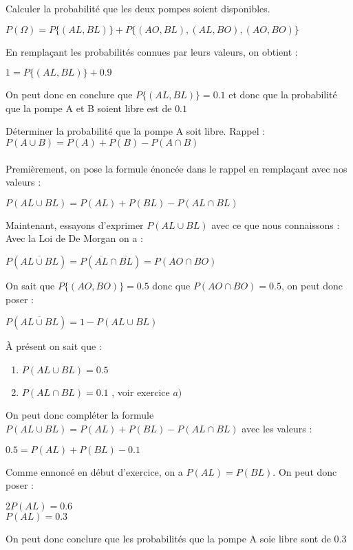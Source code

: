 \begin{exo}
\begin{subexo}{Calculer la probabilité que les deux pompes soient disponibles.}
			\begin{center}$P(\Omega) = P\{(AL,BL)\} + P\{(AO,BL),(AL,BO),(AO,BO)\}$\end{center}
			En remplaçant les probabilités connues par leurs valeurs, on obtient :
			\begin{center}$1 = P\{(AL,BL)\} + 0.9$\end{center}
			On peut donc en conclure que $P\{(AL,BL)\}  = 0.1$ et donc que la probabilité que la pompe A et B soient libre est de $0.1$
		\end{subexo}
	\begin{subexo}{Déterminer la probabilité que la pompe A soit libre.}
		Rappel : $P(A\cup B) = P(A) + P(B) - P(A \cap B)$ \\ \\ 
		Premièrement, on pose la formule énoncée dans le rappel en remplaçant avec nos valeurs :
		\begin{center}$P(AL\cup BL) = P(AL) + P(BL) - P(AL \cap BL)$\end{center}
		Maintenant, essayons d'exprimer $P(AL\cup BL)$ avec ce que nous connaissons : \\
		Avec la Loi de De Morgan on a : 
		\begin{center}$P(\overline{AL\cup BL}) = P(\overline{AL} \cap \overline{BL}) = P(AO \cap BO)$\end{center}	
		On sait que $P\{(AO,BO)\}=0.5$ donc que $P(AO \cap BO)=0.5$, on peut donc poser :
		\begin{center}$P(\overline{AL\cup BL}) = 1 - P(AL \cup BL)$\end{center}
		À présent on sait que :
		\begin{enumerate}
			\item[ ] $P(AL \cup BL) = 0.5$
			\item[ ] $P(AL \cap BL) = 0.1$ , voir exercice $a)$
		\end{enumerate}
		On peut donc compléter la formule $P(AL\cup BL) = P(AL) + P(BL) - P(AL \cap BL)$ avec les valeurs : 
		\begin{center}
			$0.5 = P(AL) + P(BL) - 0.1$
		\end{center}
		Comme ennoncé en début d'exercice, on a $P(AL) = P(BL)$. On peut donc poser :
		\begin{center}
			$2P(AL) = 0.6$ \\ $P(AL) = 0.3$
		\end{center}
		On peut donc conclure que les probabilités que la pompe A soie libre sont de 0.3
	\end{subexo}

\end{exo}
